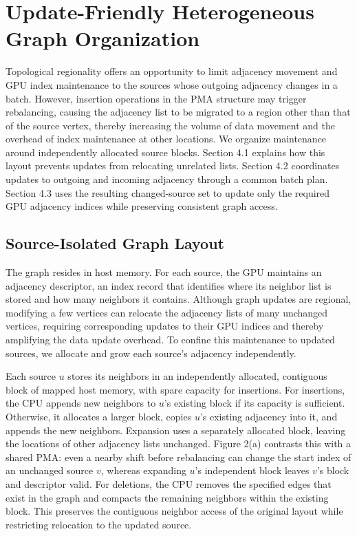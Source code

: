 \section{Update-Friendly Heterogeneous Graph Organization}

Topological regionality offers an opportunity to limit adjacency movement and GPU index maintenance to the sources whose outgoing adjacency changes in a batch. However, insertion operations in the PMA structure may trigger rebalancing, causing the adjacency list to be migrated to a region other than that of the source vertex, thereby increasing the volume of data movement and the overhead of index maintenance at other locations. We organize maintenance around independently allocated source blocks. Section 4.1 explains how this layout prevents updates from relocating unrelated lists. Section 4.2 coordinates updates to outgoing and incoming adjacency through a common batch plan. Section 4.3 uses the resulting changed-source set to update only the required GPU adjacency indices while preserving consistent graph access.

\subsection{Source-Isolated Graph Layout}

The graph resides in host memory. For each source, the GPU maintains an adjacency descriptor, an index record that identifies where its neighbor list is stored and how many neighbors it contains. Although graph updates are regional, modifying a few vertices can relocate the adjacency lists of many unchanged vertices, requiring corresponding updates to their GPU indices and thereby amplifying the data update overhead. To confine this maintenance to updated sources, we allocate and grow each source's adjacency independently.

Each source $u$ stores its neighbors in an independently allocated, contiguous block of mapped host memory, with spare capacity for insertions. For insertions, the CPU appends new neighbors to $u$'s existing block if its capacity is sufficient. Otherwise, it allocates a larger block, copies $u$'s existing adjacency into it, and appends the new neighbors. Expansion uses a separately allocated block, leaving the locations of other adjacency lists unchanged. Figure 2(a) contrasts this with a shared PMA: even a nearby shift before rebalancing can change the start index of an unchanged source $v$, whereas expanding $u$'s independent block leaves $v$'s block and descriptor valid. For deletions, the CPU removes the specified edges that exist in the graph and compacts the remaining neighbors within the existing block. This preserves the contiguous neighbor access of the original layout while restricting relocation to the updated source.

